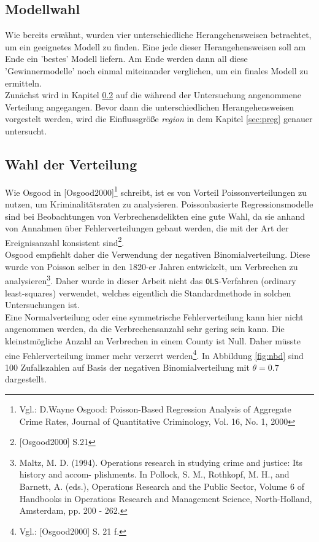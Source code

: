 \subsection{Modellwahl}
Wie bereits erw\"ahnt, wurden vier unterschiedliche Herangehensweisen betrachtet, um ein geeignetes Modell zu finden.
Eine jede dieser Herangehensweisen soll am Ende ein 'bestes' Modell liefern.
Am Ende werden dann all diese 'Gewinnermodelle' noch einmal miteinander verglichen, um ein finales Modell zu ermitteln. \\
Zun\"achst wird in Kapitel \ref{sec:wdv} auf die w\"ahrend der Untersuchung angenommene  Verteilung angegangen. 
Bevor dann die unterschiedlichen Herangehensweisen vorgestelt werden, wird die Einflussgr\"o\ss{}e \textit{region} in dem Kapitel \ref{sec:preg} genauer untersucht.

\subsection{Wahl der Verteilung}
\label{sec:wdv}
Wie Osgood in [Osgood2000]\footnote{Vgl.: D.Wayne Osgood: Poisson-Based Regression Analysis of Aggregate
Crime Rates, Journal of Quantitative Criminology, Vol. 16, No. 1, 2000}
schreibt, ist es von Vorteil Poissonverteilungen zu nutzen, um Kriminalit\"atsraten zu analysieren.
Poissonbasierte Regressionsmodelle sind bei Beobachtungen von Verbrechensdelikten eine gute Wahl, da sie anhand von Annahmen \"uber Fehlerverteilungen gebaut werden, die mit der Art der Ereignisanzahl konsistent sind\footnote{[Osgood2000] S.21}. \\
Osgood empfiehlt daher die Verwendung der negativen Binomialverteilung. Diese wurde von Poisson selber in den 1820-er Jahren entwickelt, um Verbrechen zu analysieren\footnote{Maltz, M. D. (1994). Operations research in studying crime and justice: Its history and accom-
plishments. In Pollock, S. M., Rothkopf, M. H., and Barnett, A. (eds.), Operations
Research and the Public Sector, Volume 6 of Handbooks in Operations Research and
Management Science, North-Holland, Amsterdam, pp. 200 - 262.}.
Daher wurde in dieser Arbeit nicht das \texttt{OLS}-Verfahren (ordinary least-squares) verwendet, welches eigentlich die Standardmethode in solchen Untersuchungen ist. \\
Eine Normalverteilung oder eine symmetrische Fehlerverteilung kann hier nicht angenommen werden, da die Verbrechensanzahl sehr gering sein kann.
Die kleinstm\"ogliche Anzahl an Verbrechen in einem County ist Null.
Daher m\"usste eine Fehlerverteilung immer mehr verzerrt werden\footnote{Vgl.: [Osgood2000] S. 21 f.}.
In Abbildung \ref{fig:nbd} sind 100 Zufallszahlen auf Basis der negativen Binomialverteilung mit $\theta = 0.7$ dargestellt.

